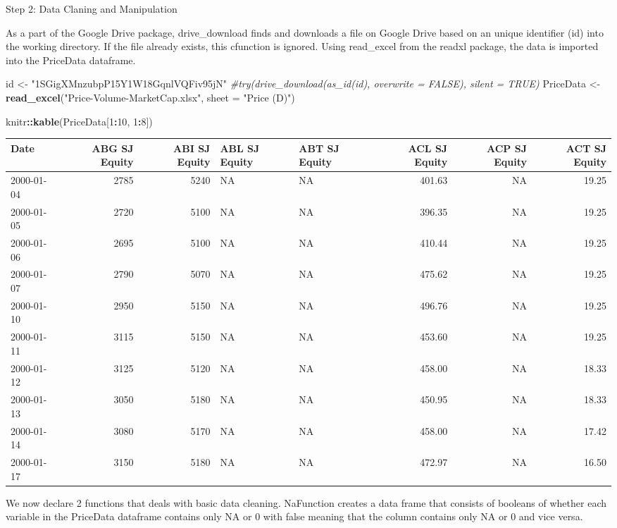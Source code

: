 \documentclass[]{article}
\newenvironment{Shaded}{\begin{snugshade}}{\end{snugshade}}
\newcommand{\KeywordTok}[1]{\textcolor[rgb]{0.13,0.29,0.53}{\textbf{#1}}}
\newcommand{\DataTypeTok}[1]{\textcolor[rgb]{0.13,0.29,0.53}{#1}}
\newcommand{\DecValTok}[1]{\textcolor[rgb]{0.00,0.00,0.81}{#1}}
\newcommand{\StringTok}[1]{\textcolor[rgb]{0.31,0.60,0.02}{#1}}
\newcommand{\CommentTok}[1]{\textcolor[rgb]{0.56,0.35,0.01}{\textit{#1}}}
\newcommand{\OperatorTok}[1]{\textcolor[rgb]{0.81,0.36,0.00}{\textbf{#1}}}
\newcommand{\NormalTok}[1]{#1}
\begin{document}
Step 2: Data Claning and Manipulation

As a part of the Google Drive package, drive\_download finds and
downloads a file on Google Drive based on an unique identifier (id) into
the working directory. If the file already exists, this cfunction is
ignored. Using read\_excel from the readxl package, the data is imported
into the PriceData dataframe.

\begin{Shaded}
\begin{Highlighting}[]
\NormalTok{id <-}\StringTok{  "1SGigXMnzubpP15Y1W18GqnlVQFiv95jN"}
\CommentTok{#try(drive_download(as_id(id), overwrite = FALSE), silent = TRUE)}
\NormalTok{PriceData <-}\StringTok{ }\KeywordTok{read_excel}\NormalTok{(}\StringTok{"Price-Volume-MarketCap.xlsx"}\NormalTok{, }
                        \DataTypeTok{sheet =} \StringTok{"Price (D)"}\NormalTok{) }

\NormalTok{knitr}\OperatorTok{::}\KeywordTok{kable}\NormalTok{(PriceData[}\DecValTok{1}\OperatorTok{:}\DecValTok{10}\NormalTok{, }\DecValTok{1}\OperatorTok{:}\DecValTok{8}\NormalTok{])}
\end{Highlighting}
\end{Shaded}

\begin{longtable}[]{@{}lrrllrrr@{}}
\toprule
Date & ABG SJ Equity & ABI SJ Equity & ABL SJ Equity & ABT SJ Equity &
ACL SJ Equity & ACP SJ Equity & ACT SJ Equity\tabularnewline
\midrule
\endhead
2000-01-04 & 2785 & 5240 & NA & NA & 401.63 & NA & 19.25\tabularnewline
2000-01-05 & 2720 & 5100 & NA & NA & 396.35 & NA & 19.25\tabularnewline
2000-01-06 & 2695 & 5100 & NA & NA & 410.44 & NA & 19.25\tabularnewline
2000-01-07 & 2790 & 5070 & NA & NA & 475.62 & NA & 19.25\tabularnewline
2000-01-10 & 2950 & 5150 & NA & NA & 496.76 & NA & 19.25\tabularnewline
2000-01-11 & 3115 & 5150 & NA & NA & 453.60 & NA & 19.25\tabularnewline
2000-01-12 & 3125 & 5120 & NA & NA & 458.00 & NA & 18.33\tabularnewline
2000-01-13 & 3050 & 5180 & NA & NA & 450.95 & NA & 18.33\tabularnewline
2000-01-14 & 3080 & 5170 & NA & NA & 458.00 & NA & 17.42\tabularnewline
2000-01-17 & 3150 & 5180 & NA & NA & 472.97 & NA & 16.50\tabularnewline
\bottomrule
\end{longtable}

We now declare 2 functions that deals with basic data cleaning.
NaFunction creates a data frame that consists of booleans of whether
each variable in the PriceData dataframe contains only NA or 0 with
false meaning that the column contains only NA or 0 and vice versa.
\end{document}
